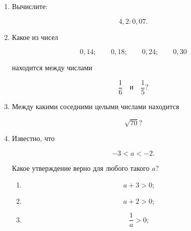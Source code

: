 \documentclass[a4paper,12pt]{article}
\begin{document}
\begin{enumerate}[label=\textbf{\arabic*.}]
    \begin{enumerate}[label=\arabic*)]
        \item
        \[
        2{,}34+3{,}15;
        \]

        \item
        \[
        2{,}34\cdot2{,}1.
        \]
    \end{enumerate}


    \item
    Вычислите:

    \[
    4{,}2:0{,}07.
    \]


    \item
    Какое из чисел

    \[
    0{,}14;
    \qquad
    0{,}18;
    \qquad
    0{,}24;
    \qquad
    0{,}30
    \]

    находится между числами

    \[
    \frac16
    \quad\text{и}\quad
    \frac15?
    \]


    \item
    Между какими соседними целыми числами находится

    \[
    \sqrt{70}?
    \]


    \item
    Известно, что

    \[
    -3<a<-2.
    \]

    Какое утверждение верно для любого такого $a$?

    \begin{enumerate}[label=\arabic*)]
        \item
        \[
        a+3>0;
        \]

        \item
        \[
        a+2>0;
        \]

        \item
        \[
        \frac1a>0;
        \]


\end{enumerate}
\end{enumerate}
\end{document}
